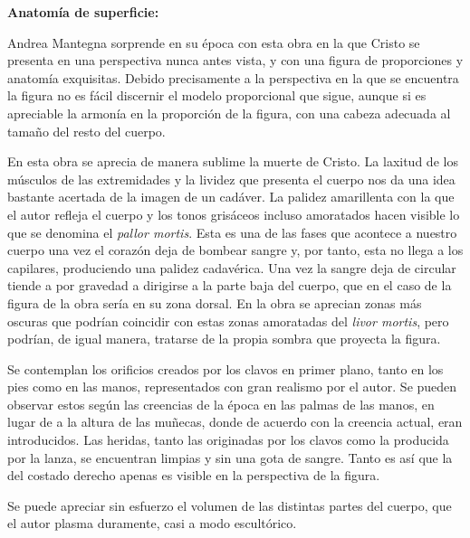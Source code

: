 
\vspace{12pt}
\textbf{Anatomía de superficie:}

Andrea Mantegna sorprende en su época con esta obra en la que Cristo se presenta en una perspectiva nunca antes vista, y con una figura de proporciones y anatomía exquisitas. Debido precisamente a la perspectiva en la que se encuentra la figura no es fácil discernir el modelo proporcional que sigue, aunque si es apreciable la armonía en la proporción de la figura, con una cabeza adecuada al tamaño del resto del cuerpo.

En esta obra se aprecia de manera sublime la muerte de Cristo. La laxitud de los músculos de las extremidades y la lividez que presenta el cuerpo nos da una idea bastante acertada de la imagen de un cadáver. La palidez amarillenta con la que el autor refleja el cuerpo y los tonos grisáceos incluso amoratados hacen visible lo que se denomina el \textit{pallor mortis}. Esta es una de las fases que acontece a nuestro cuerpo una vez el corazón deja de bombear sangre y, por tanto, esta no llega a los capilares, produciendo una palidez cadavérica. Una vez la sangre deja de circular tiende a por gravedad a dirigirse a la parte baja del cuerpo, que en el caso de la figura de la obra sería en su zona dorsal. En la obra se aprecian zonas más oscuras que podrían coincidir con estas zonas amoratadas del \textit{livor mortis}, pero podrían, de igual manera, tratarse de la propia sombra que proyecta la figura.

Se contemplan los orificios creados por los clavos en primer plano, tanto en los pies como en las manos, representados con gran realismo por el autor. Se pueden observar estos según las creencias de la época en las palmas de las manos, en lugar de a la altura de las muñecas, donde de acuerdo con la creencia actual, eran introducidos.
Las heridas, tanto las originadas por los clavos como la producida por la lanza, se encuentran limpias y sin una gota de sangre. Tanto es así que la del costado derecho apenas es visible en la perspectiva de la figura.

Se puede apreciar sin esfuerzo el volumen de las distintas partes del cuerpo, que el autor plasma duramente, casi a modo escultórico. 

